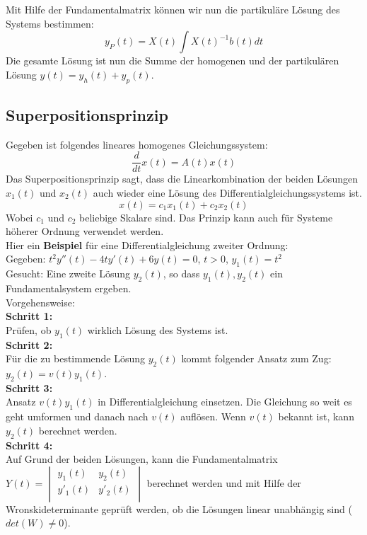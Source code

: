 Mit Hilfe der Fundamentalmatrix können wir nun die partikuläre Lösung des Systems bestimmen:\\
\begin{equation*}
y_P(t) = X(t) \int{X(t)^{-1}b(t)dt}
\end{equation*}
Die gesamte Lösung ist nun die Summe der homogenen und der partikulären Lösung $y(t) = y_h(t) + y_p(t)$.

\newpage
\subsection{Superpositionsprinzip}
Gegeben ist folgendes lineares homogenes Gleichungssystem:
\begin{equation*}
\frac{d}{dt}x(t) = A(t)x(t)
\end{equation*}
Das Superpositionsprinzip sagt, dass die Linearkombination der beiden Lösungen $x_1(t)$ und $x_2(t)$ auch wieder eine Lösung des Differentialgleichungssystems ist. 
\begin{equation*}
	x(t) = c_1 x_1(t) + c_2 x_2(t)
\end{equation*}
Wobei $c_1$ und $c_2$ beliebige Skalare sind. 
Das Prinzip kann auch für Systeme höherer Ordnung verwendet werden. \\

Hier ein \textbf{Beispiel} für eine Differentialgleichung zweiter Ordnung: \\
Gegeben: $t^2y''(t)-4ty'(t)+6y(t)=0$, $t>0$, $y_1(t)=t^2$\\
Gesucht: Eine zweite Lösung $y_2(t)$, so dass ${y_1(t),y_2(t)}$ ein Fundamentalsystem ergeben. \\
Vorgehensweise: \\
\textbf{Schritt 1:}\\
Prüfen, ob $y_1(t)$ wirklich Lösung des Systems ist. \\
\textbf{Schritt 2:}\\
Für die zu bestimmende Lösung $y_2(t)$ kommt folgender Ansatz zum Zug: $y_2(t) = v(t)y_1(t)$.\\
\textbf{Schritt 3:}\\
Ansatz $v(t)y_1(t)$ in Differentialgleichung einsetzen. Die Gleichung so weit es geht umformen und danach nach $v(t)$ auflösen. Wenn $v(t)$ bekannt ist, kann $y_2(t)$ berechnet werden. \\
\textbf{Schritt 4:}\\
Auf Grund der beiden Lösungen, kann die Fundamentalmatrix $Y(t) =
\begin{vmatrix} 
	        y_{1}(t) & y_{2}(t)\\ 
	        y'_{1}(t) & y'_{2}(t)\\   
\end{vmatrix} $ berechnet werden und mit Hilfe der Wronskideterminante geprüft werden, ob die Lösungen linear unabhängig sind ($det(W) \neq 0$). 

